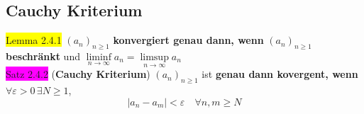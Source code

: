 \documentclass[landscape, 10pt]{article}
\begin{document}
\begin{multicols}{3}
       \subsection{Cauchy Kriterium}
              \colorbox{yellow}{Lemma 2.4.1} 
                     $(a_n)_{n\geqslant1}$ \textbf{konvergiert genau dann, wenn} 
                     \textcolor{NavyBlue}{$(a_n)_{n\geqslant1}$} 
                     \textbf{beschränkt} und 
                     \textcolor{NavyBlue}{$\liminf\limits_{n\to\infty}a_n
                     =\limsup\limits_{n\to\infty}a_n$}\\
              \colorbox{magenta}{Satz 2.4.2} 
              (\textbf{Cauchy Kriterium})
                      $(a_n)_{n\geqslant1}$ ist
                     \textbf{genau dann kovergent, wenn} 
                     \textcolor{NavyBlue}{
                     $\forall\varepsilon >0\,\exists N\geqslant1$}, 
                     \begin{equation*}
                            |a_n-a_m|<\varepsilon\quad
                            \forall n,m\geqslant N
                     \end{equation*}

\end{multicols}
\end{document}
